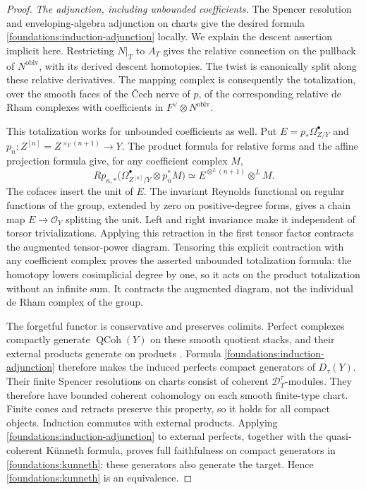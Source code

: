 \documentclass[11pt]{article}
\numberwithin{equation}{section}
\theoremstyle{definition}
\theoremstyle{remark}
\begin{document}
\begin{proof}
\emph{The adjunction, including unbounded coefficients.}
The Spencer resolution and enveloping-algebra adjunction on charts give
the desired formula \eqref{foundations:induction-adjunction} locally.
We explain the descent assertion implicit here.  Restricting $N|_T$ to
$A_T$ gives the relative connection on the pullback of
$N^{\mathrm{oblv}}$, with its derived descent homotopies.  The twist is
canonically split along these relative derivatives.  The mapping
complex is consequently the totalization, over the smooth faces of the
\v Cech nerve of $p$, of the corresponding relative de Rham complexes
with coefficients in $F^\vee\otimes N^{\mathrm{oblv}}$.

This totalization works for unbounded coefficients as well.  Put
$E=p_*\Omega^\bullet_{Z/Y}$ and
$p_n:Z^{[n]}=Z^{\times_Y(n+1)}\to Y$.  The product formula for relative
forms and the affine projection formula give, for any coefficient
complex $M$,
\[
 Rp_{n,*}\bigl(\Omega^\bullet_{Z^{[n]}/Y}\otimes p_n^*M\bigr)
 \simeq E^{\otimes^L(n+1)}\otimes^L M.
\]
The cofaces insert the unit of $E$.
The invariant Reynolds functional on
regular functions of the group, extended by zero on positive-degree
forms, gives a chain map $E\to\mathcal O_Y$ splitting the unit.
Left and right invariance make it independent of torsor
trivializations.  Applying this retraction in the first tensor factor
contracts the augmented tensor-power diagram.  Tensoring this explicit
contraction with any coefficient complex proves the asserted
unbounded totalization formula: the homotopy lowers cosimplicial degree
by one, so it acts on the product totalization without an infinite sum.
It contracts the augmented diagram,
not the individual de Rham complex of the group.

The forgetful functor is conservative and preserves colimits.  Perfect
complexes compactly generate $\operatorname{QCoh}(Y)$ on these smooth
quotient stacks, and their external products generate on products
\cite[Sections~3--4]{DrinfeldGaitsgoryFiniteness}.  Formula
\eqref{foundations:induction-adjunction} therefore makes the induced
perfects compact generators of $D_\tau(Y)$.  Their finite Spencer
resolutions on charts consist of coherent $\mathcal D_T^\tau$-modules.
They therefore have bounded coherent cohomology on each smooth
finite-type chart.  Finite cones and retracts preserve this property,
so it holds for all compact objects.  Induction commutes with external
products.  Applying
\eqref{foundations:induction-adjunction} to external perfects, together
with the quasi-coherent K\"unneth formula, proves full faithfulness on
compact generators in \eqref{foundations:kunneth}; these generators also
generate the target.  Hence \eqref{foundations:kunneth} is an equivalence.


\end{proof}
\end{document}
